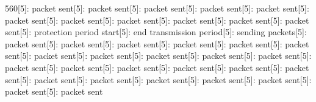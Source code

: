 \documentclass[parskip]{cs4rep}
\begin{document}
560[5]: packet sent[5]: packet sent[5]: packet sent[5]: packet sent[5]: packet sent[5]: packet sent[5]: packet sent[5]: packet sent[5]: packet sent[5]: packet sent[5]: packet sent[5]: protection period start[5]: end transmission period[5]: sending packets[5]: packet sent[5]: packet sent[5]: packet sent[5]: packet sent[5]: packet sent[5]: packet sent[5]: packet sent[5]: packet sent[5]: packet sent[5]: packet sent[5]: packet sent[5]: packet sent[5]: packet sent[5]: packet sent[5]: packet sent[5]: packet sent[5]: packet sent[5]: packet sent[5]: packet sent[5]: packet sent[5]: packet sent[5]: packet sent[5]: packet sent[5]: packet sent\newline
\end{document}
